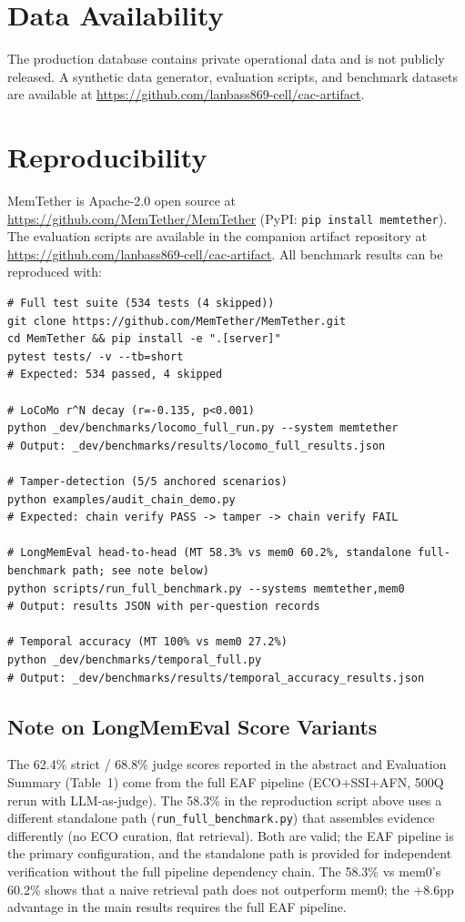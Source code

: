 \documentclass[11pt]{article}
\begin{document}
\section*{Data Availability}
The production database contains private operational data and is not publicly released. A synthetic data generator, evaluation scripts, and benchmark datasets are available at \url{https://github.com/lanbass869-cell/cac-artifact}.
\section{Reproducibility}
\label{sec:repro}

MemTether is Apache-2.0 open source at \url{https://github.com/MemTether/MemTether} (PyPI: \texttt{pip install memtether}). The evaluation scripts are available in the companion artifact repository at \url{https://github.com/lanbass869-cell/cac-artifact}. All benchmark results can be reproduced with:

\begin{verbatim}
# Full test suite (534 tests (4 skipped))
git clone https://github.com/MemTether/MemTether.git
cd MemTether && pip install -e ".[server]"
pytest tests/ -v --tb=short
# Expected: 534 passed, 4 skipped

# LoCoMo r^N decay (r=-0.135, p<0.001)
python _dev/benchmarks/locomo_full_run.py --system memtether
# Output: _dev/benchmarks/results/locomo_full_results.json

# Tamper-detection (5/5 anchored scenarios)
python examples/audit_chain_demo.py
# Expected: chain verify PASS -> tamper -> chain verify FAIL

# LongMemEval head-to-head (MT 58.3% vs mem0 60.2%, standalone full-benchmark path; see note below)
python scripts/run_full_benchmark.py --systems memtether,mem0
# Output: results JSON with per-question records

# Temporal accuracy (MT 100% vs mem0 27.2%)
python _dev/benchmarks/temporal_full.py
# Output: _dev/benchmarks/results/temporal_accuracy_results.json
\end{verbatim}


\subsection{Note on LongMemEval Score Variants}
The 62.4\% strict / 68.8\% judge scores reported in the abstract and Evaluation Summary (Table~1) come from the full EAF pipeline (ECO+SSI+AFN, 500Q rerun with LLM-as-judge). The 58.3\% in the reproduction script above uses a different standalone path (\texttt{run\_full\_benchmark.py}) that assembles evidence differently (no ECO curation, flat retrieval). Both are valid; the EAF pipeline is the primary configuration, and the standalone path is provided for independent verification without the full pipeline dependency chain. The 58.3\% vs mem0's 60.2\% shows that a naive retrieval path does not outperform mem0; the +8.6pp advantage in the main results requires the full EAF pipeline.
\end{document}
